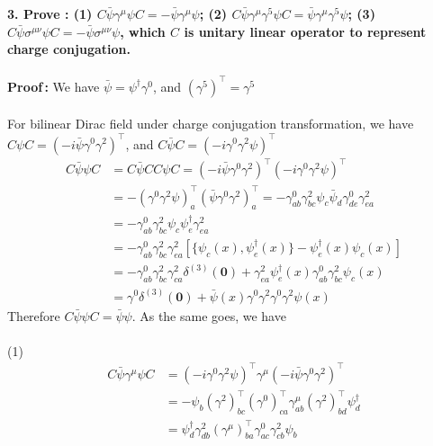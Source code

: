 \documentclass[12pt]{article}
\begin{document}
\begin{spacing}{1.5}
\textbf{3. Prove : (1) $\displaystyle C\bar\psi\gamma^{\mu}\psi C = -\bar\psi\gamma^{\mu}\psi$; \quad (2) $\displaystyle C\bar\psi\gamma^{\mu}\gamma^{5}\psi C = \bar\psi\gamma^{\mu}\gamma^{5}\psi$; \quad (3) $\displaystyle C\bar\psi\sigma^{\mu\nu}\psi C = -\bar\psi\sigma^{\mu\nu}\psi$, which $C$ is unitary linear operator  to represent charge conjugation.} \\		%
~\\
\textbf{Proof\,:} We have $\displaystyle \bar\psi=\psi^{\dagger}\gamma^{0}$, and $\displaystyle (\gamma^{5})^{\top}=\gamma^{5}$\\	%
~\\
For bilinear Dirac field under charge conjugation transformation, we have $C\psi C = (-i\bar\psi\gamma^{0}\gamma^{2})^{\top}$, and $C\bar\psi C = (-i\gamma^{0}\gamma^{2}\psi)^{\top}$
\begin{align*}
C\bar\psi\psi C &= C\bar\psi CC \psi C = (-i\bar\psi\gamma^{0}\gamma^{2})^{\top} (-i\gamma^{0}\gamma^{2}\psi)^{\top} \\
&= - (\gamma^{0}\gamma^{2}\psi)^{\top}_{a} (\bar\psi\gamma^{0}\gamma^{2})^{\top}_{a} = - \gamma^{0}_{ab}\gamma^{2}_{bc}\psi_{c} \bar\psi_{d}\gamma^{0}_{de}\gamma^{2}_{ea} \\
&= - \gamma^{0}_{ab}\gamma^{2}_{bc}\psi_{c} \psi_{e}^{\dag}\gamma^{2}_{ea} \\
&= - \gamma^{0}_{ab}\gamma^{2}_{bc}\gamma^{2}_{ea} \left[ \{\psi_{c}(x),\psi_{e}^{\dag}(x)\} - \psi_{e}^{\dag}(x)\psi_{c}(x) \right] \\
&= - \gamma^{0}_{ab}\gamma^{2}_{bc}\gamma^{2}_{ca}\delta^{(3)}(\bm0) + \gamma^{2}_{ea}\psi^{\dag}_{e}(x)\gamma^{0}_{ab}\gamma^{2}_{bc}\psi_{c}(x) \\
&= \gamma^{0} \delta^{(3)}(\bm0) + \bar\psi(x)\gamma^{0}\gamma^{2}\gamma^{0}\gamma^{2}\psi(x)
\end{align*}
Therefore $\displaystyle C\bar\psi\psi C = \bar\psi\psi$. As the same goes, we have\\
~\\
(1) 
\begin{align*}
	C\bar\psi\gamma^{\mu}\psi C &= (-i\gamma^{0}\gamma^{2}\psi)^{\top}\gamma^{\mu}(-i\bar\psi\gamma^{0}\gamma^{2})^{\top}\\
	&= -\psi_{b} (\gamma^{2})^{\top}_{bc}(\gamma^{0})^{\top}_{ca} \gamma^{\mu}_{ab} (\gamma^{2})^{\top}_{bd} \psi^{\dagger}_{d} \\
	&= \psi^{\dagger}_{d} \gamma^{2}_{db} (\gamma^{\mu})^{\top}_{ba} \gamma^{0}_{ac}\gamma^{2}_{cb} \psi_{b} \\

\end{align*}
\end{spacing}
\end{document}
